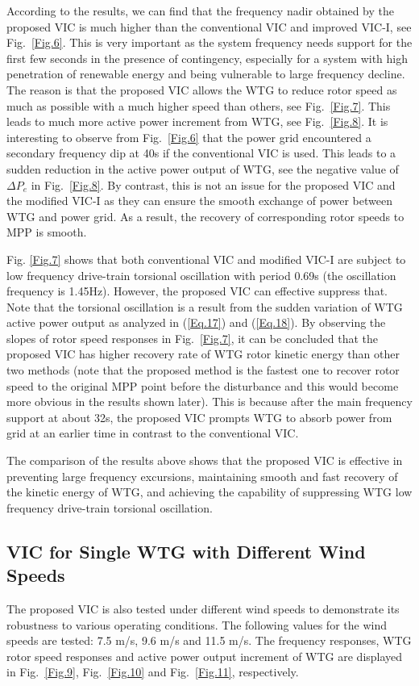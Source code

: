 \documentclass[journal]{IEEEtran}
\begin{document}
According to the results, we can find that the frequency nadir obtained by the proposed VIC is much higher than the conventional VIC and improved VIC-I, see Fig.~\ref{Fig.6}. This is very important as the system frequency needs support for the first few seconds in the presence of contingency, especially for a system with high penetration of renewable energy and being vulnerable to large frequency decline. The reason is that the proposed VIC allows the WTG to reduce rotor speed as much as possible with a much higher speed than others, see Fig.~\ref{Fig.7}. This leads to much more active power increment from WTG, see Fig.~\ref{Fig.8}. It is interesting to observe from Fig.~\ref{Fig.6} that the power grid encountered a secondary frequency dip at 40s if the conventional VIC is used. This leads to a sudden reduction in the active power output of WTG, see the negative value of $\Delta P_e$ in Fig.~\ref{Fig.8}. By contrast, this is not an issue for the proposed VIC and the modified VIC-I as they can ensure the smooth exchange of power between WTG and power grid. As a result, the recovery of corresponding rotor speeds to MPP is smooth.

Fig. \ref{Fig.7} shows that both conventional VIC and modified VIC-I are subject to low frequency drive-train torsional oscillation with period 0.69s (the oscillation frequency is 1.45Hz). However, the proposed VIC can effective suppress that. Note that the torsional oscillation is a result from the sudden variation of WTG active power output as analyzed in (\ref{Eq.17}) and (\ref{Eq.18}). By observing the slopes of rotor speed responses in Fig.~\ref{Fig.7}, it can be concluded that the proposed VIC has higher recovery rate of WTG rotor kinetic energy than other two methods (note that the proposed method is the fastest one to recover rotor speed to the original MPP point before the disturbance and this would become more obvious in the results shown later). This is because after the main frequency support at about 32s, the proposed VIC prompts WTG to absorb power from grid at an earlier time in contrast to the conventional VIC. 

The comparison of the results above shows that the proposed VIC is effective in preventing large frequency excursions, maintaining smooth and fast recovery of the kinetic energy of WTG, and achieving the capability of suppressing WTG low frequency drive-train torsional oscillation.

\vspace{-0.3cm}
\subsection{VIC for Single WTG with Different Wind Speeds}
The proposed VIC is also tested under different wind speeds to demonstrate its robustness to various operating conditions. The following values for the wind speeds are tested: 7.5 m/s, 9.6 m/s and 11.5 m/s.  The frequency responses, WTG rotor speed responses and active power output increment of WTG are displayed in Fig.~\ref{Fig.9}, Fig.~\ref{Fig.10} and Fig.~\ref{Fig.11}, respectively.
\end{document}

